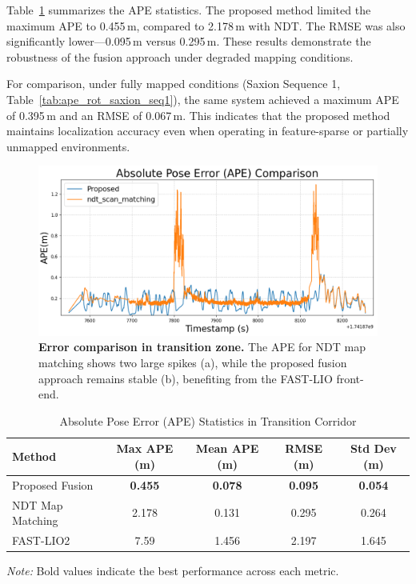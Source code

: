 Table~\ref{tab:ape-unmapped-comparison} summarizes the APE statistics. The proposed method limited the maximum APE to 0.455\,m, compared to 2.178\,m with NDT. The RMSE was also significantly lower—0.095\,m versus 0.295\,m. These results demonstrate the robustness of the fusion approach under degraded mapping conditions.

For comparison, under fully mapped conditions (Saxion Sequence 1, Table~\ref{tab:ape_rot_saxion_seq1}), the same system achieved a maximum APE of 0.395\,m and an RMSE of 0.067\,m. This indicates that the proposed method maintains localization accuracy even when operating in feature-sparse or partially unmapped environments.

\begin{figure}[H]
	\centering
	\includegraphics[width=\linewidth]{images/ape_comparison_aligned_unmapped2.png}
	\caption[Error compression in transition zone]{
		\textbf{Error comparison in transition zone.} The APE for NDT map matching shows two large spikes (a), while the proposed fusion approach remains stable (b), benefiting from the FAST-LIO front-end.}
	\label{fig:ape-error-unmapped}
\end{figure}



\begin{table}[H]
	\centering
	\caption{Absolute Pose Error (APE) Statistics in Transition Corridor}
	\label{tab:ape-unmapped-comparison}
	\begin{tabular}{lcccc}
		\toprule
		\textbf{Method} & \textbf{Max APE (m)} & \textbf{Mean APE (m)} & \textbf{RMSE (m)} & \textbf{Std Dev (m)} \\
		\midrule
		Proposed Fusion   &\textbf{ 0.455} & \textbf{0.078} & \textbf{0.095} &\textbf{ 0.054} \\
		NDT Map Matching & 2.178 & 0.131 & 0.295 & 0.264 \\
		FAST-LIO2   & 7.59 & 1.456  & 2.197 & 1.645 \\
		\bottomrule
	\end{tabular}
{\footnotesize \textit{Note:} Bold values indicate the best performance across each metric.}
\end{table}


